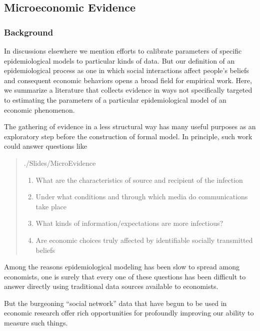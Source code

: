 \subsection{Microeconomic Evidence}\label{subsec:microEvidence}

\subsubsection{Background}
In discussions elsewhere we mention efforts to calibrate parameters of specific epidemiological models to particular kinds of data.  But our definition of an epidemiological process as one in which social interactions affect people's beliefs and consequent economic behaviors opens a broad field for empirical work.  Here, we summarize a literature that collects evidence in ways not specifically targeted to estimating the parameters of a particular epidemiological model of an economic phenomenon.

The gathering of evidence in a less structural way has many useful purposes as an exploratory step before the construction of formal model. In principle, such work could answer questions like
\begin{quote}
    \normalfont
    \begin{verbatimwrite}{./Slides/MicroEvidence}
\begin{enumerate}
    \item What are the characteristics of source and recipient of the infection
    \item Under what conditions and through which media do communications take place
    \item What kinds of information/expectations are more infectious?
    \item Are economic choices truly affected by identifiable socially transmitted beliefs
    \end{enumerate}
\end{verbatimwrite}


\end{quote}

Among the reasons epidemiological modeling has been slow to spread among economists, one is surely that every one of these questions has been difficult to answer directly using traditional data sources available to economists.

But the burgeoning ``social network'' data that have begun to be used in economic research offer rich opportunities for profoundly improving our ability to measure such things.

